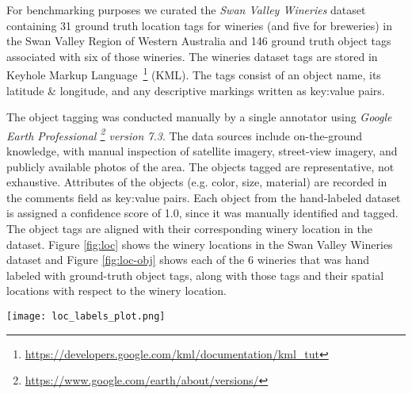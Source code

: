 For benchmarking purposes we curated the \emph{Swan Valley Wineries} dataset containing 31 ground truth location tags for wineries (and five for breweries) in the Swan Valley Region of Western Australia and 146 ground truth object tags associated with six of those wineries. 
The wineries dataset tags are stored in Keyhole Markup Language~\footnote{\href{https://developers.google.com/kml/documentation/kml\_tut}{https://developers.google.com/kml/documentation/kml\_tut}} (KML).
The tags consist of an object name, its latitude \& longitude, and any descriptive markings written as key:value pairs. 

The object tagging was conducted manually by a single annotator using \textit{Google Earth Professional \footnote{\href{https://www.google.com/earth/about/versions/}{https://www.google.com/earth/about/versions/}} version 7.3}. 
The data sources include on-the-ground knowledge, with manual inspection of satellite imagery, street-view imagery, and publicly available photos of the area. 
The objects tagged are representative, not exhaustive. 
Attributes of the objects (e.g. color, size, material) are recorded in the comments field as key:value pairs.
Each object from the hand-labeled dataset is assigned a confidence score of 1.0, since it was manually identified and tagged.
The object tags are aligned with their corresponding winery location in the dataset.
Figure \ref{fig:loc} shows the winery locations in the Swan Valley Wineries dataset and Figure \ref{fig:loc-obj} shows each of the 6 wineries that was hand labeled with ground-truth object tags, along with those tags and their spatial locations with respect to the winery location.



\begin{figure*}[ht]       
    \texttt{[image: loc\_labels\_plot.png]}
    \centering
    \caption[width=\textwidth]{The Swan Valley Wineries dataset has six locations with annotated objects, and another 30 without manually annotated objects, but with confirmed location coordinates.}
    \label{fig:loc} 
\end{figure*}


